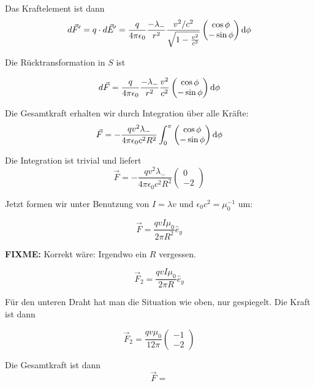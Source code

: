 \documentclass[a4paper,german,12pt,smallheadings]{scrartcl}
\begin{document}
Das Kraftelement ist dann
\begin{equation}
  d \vec{F}' = q \cdot d \vec{E}'
            = \frac{q}{4 \pi \epsilon_0} \frac{-\lambda_-}{r^2} \frac{v^2/c^2}{\sqrt{1 - \frac{v^2}{c^2}}} \begin{pmatrix} \cos \phi \\ -\sin \phi\end{pmatrix} \dif \phi
\end{equation}

Die Rücktransformation in $S$ ist

\begin{equation}
d \vec{F} = \frac{q}{4 \pi \epsilon_0} \frac{-\lambda_-}{r^2} \frac{v^2}{c^2}
\begin{pmatrix} \cos \phi \\ -\sin \phi\end{pmatrix} \dif \phi
\end{equation}

Die Gesamtkraft erhalten wir durch Integration über alle Kräfte:
\begin{equation}
  \vec{F} = -\frac{q v^2 \lambda_{-}}{4 \pi \epsilon_0 c^2 R^2} \int_0^\pi
   \begin{pmatrix} \cos \phi \\ -\sin \phi\end{pmatrix} \dif \phi
\end{equation}

Die Integration ist trivial und liefert
\begin{equation}
  \vec{F} = -\frac{q v^2 \lambda_{-}}{4 \pi \epsilon_0 c^2 R^2}
\begin{pmatrix} 0 \\ -2\end{pmatrix}
\end{equation}

Jetzt formen wir unter Benutzung von $I = \lambda v$ und $\epsilon_0 c^2 =
\mu_0^{-1}$ um:

\begin{equation}
  \vec{F} = \frac{q v I \mu_0}{2 \pi R^2} \hat{e}_y
\end{equation}

\textbf{FIXME:} Korrekt wäre: Irgendwo ein $R$ vergessen.

\begin{equation}
  \vec{F}_2 = \frac{q v I \mu_0}{2 \pi R} \hat{e}_y
\end{equation}

Für den unteren Draht hat man die Situation wie oben, nur gespiegelt. Die Kraft
ist dann

\begin{equation}
  \vec{F}_2
  = \frac{qv \mu_0}{12 \pi} \begin{pmatrix} -1 \\ -2 \end{pmatrix}
\end{equation}

Die Gesamtkraft ist dann
\begin{equation}
  \vec{F} =
\end{equation}
\end{document}
